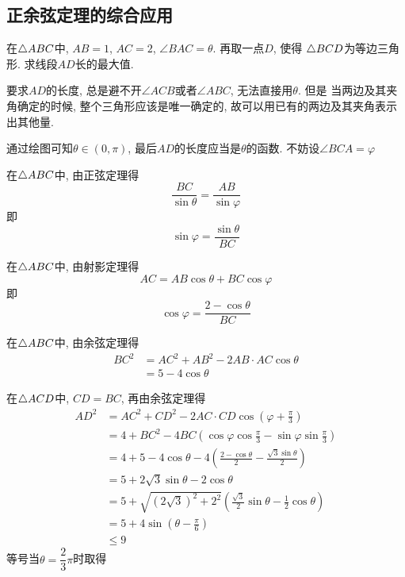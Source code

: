 \subsection{正余弦定理的综合应用}
\begin{example}
    在\(\triangle ABC\)中, \(AB=1\), \(AC=2\), \(\angle BAC=\theta\). 再取一点\(D\), 使得
    \(\triangle BCD\)为等边三角形. 求线段\(AD\)长的最大值. 
\end{example}
\begin{analyse}
    要求\(AD\)的长度, 总是避不开\(\angle ACB\)或者\(\angle ABC\), 无法直接用\(\theta\). 但是
    当两边及其夹角确定的时候, 整个三角形应该是唯一确定的, 故可以用已有的两边及其夹角表示出其他量. 
\end{analyse}
\begin{jie}
    通过绘图可知\(\theta\in(0,\pi)\), 最后\(AD\)的长度应当是\(\theta\)的函数. 
    不妨设\(\angle BCA=\varphi\)

    在\(\triangle ABC\)中, 由正弦定理得\[\frac{BC}{\sin\theta}=\frac{AB}{\sin\varphi}\]
    即\[\sin\varphi=\frac{\sin\theta}{BC}\]

    在\(\triangle ABC\)中, 由射影定理得\[AC=AB\cos\theta+BC\cos\varphi\]
    即\[\cos\varphi=\frac{2-\cos\theta}{BC}\]

    在\(\triangle ABC\)中, 由余弦定理得
    \begin{align*}
         BC^2&=AC^2+AB^2-2AB\cdot AC\cos\theta\\
            &=5-4\cos\theta
    \end{align*}
   
    在\(\triangle ACD\)中, $CD=BC$, 再由余弦定理得
    \begin{align*}
        AD^2&=AC^2+CD^2-2AC\cdot CD\cos(\varphi+\frac{\pi}{3})\\
            &=4+BC^2-4BC(\cos\varphi\cos\frac{\pi}{3}-\sin\varphi\sin\frac{\pi}{3})\\
            &=4+5-4\cos\theta-4(\frac{2-\cos\theta}{2}-\frac{\sqrt{3}\sin\theta}{2})\\
            &=5+2\sqrt{3}\sin\theta-2\cos\theta\\
            &=5+\sqrt{(2\sqrt{3})^2+2^2}(\frac{\sqrt{3}}{2}\sin\theta-\frac{1}{2}\cos\theta)\\
            &=5+4\sin(\theta-\frac{\pi}{6})\\
            &\leq9
    \end{align*}
    等号当\(\theta=\dfrac{2}{3}\pi\)时取得

\end{jie}


